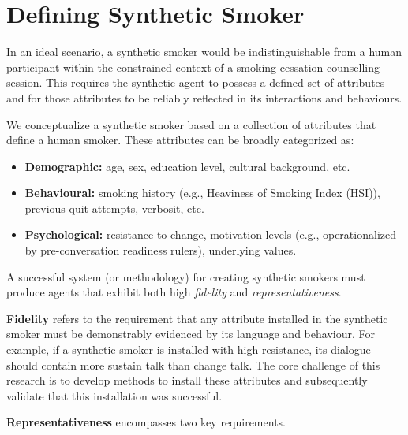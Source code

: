\section{Defining Synthetic Smoker}
\label{sec:synthetic-smoker-ideal}

In an ideal scenario, a synthetic smoker would be indistinguishable from a human participant within the constrained context of a smoking cessation counselling session. This requires the synthetic agent to possess a defined set of attributes and for those attributes to be reliably reflected in its interactions and behaviours.

We conceptualize a synthetic smoker based on a collection of attributes that define a human smoker. These attributes can be broadly categorized as:

\begin{itemize}
    \item \textbf{Demographic:} age, sex, education level, cultural background, etc.
    \item \textbf{Behavioural:} smoking history (e.g., Heaviness of Smoking Index (HSI)), previous quit attempts, verbosit, etc.
    \item \textbf{Psychological:} resistance to change, motivation levels (e.g., operationalized by pre-conversation readiness rulers), underlying values.
\end{itemize}

A successful system (or methodology) for creating synthetic smokers must produce agents that exhibit both high \emph{fidelity} and \emph{representativeness}.

\textbf{Fidelity} refers to the requirement that any attribute installed in the synthetic smoker must be demonstrably evidenced by its language and behaviour. For example, if a synthetic smoker is installed with high resistance, its dialogue should contain more sustain talk than change talk. The core challenge of this research is to develop methods to install these attributes and subsequently validate that this installation was successful.

\textbf{Representativeness} encompasses two key requirements. 

